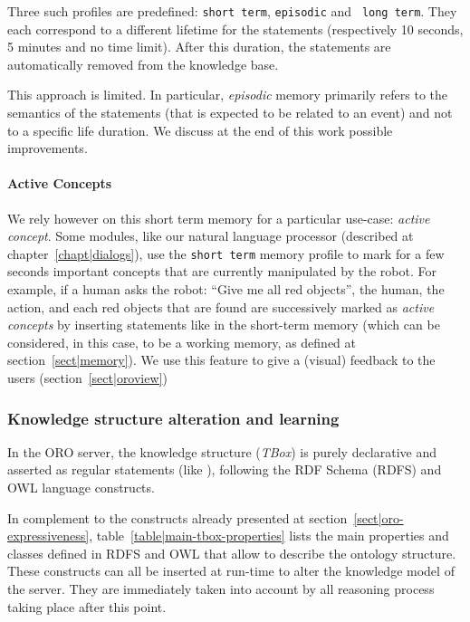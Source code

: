 Three such profiles are predefined: {\tt short term}, {\tt episodic} and {\tt
long term}. They each correspond to a different lifetime for the statements
(respectively 10 seconds, 5 minutes and no time limit). After this duration,
the statements are automatically removed from the knowledge base.

This approach is limited. In particular, \emph{episodic} memory primarily refers
to the semantics of the statements (that is expected to be related to an event)
and not to a specific life duration. We discuss at the end of this work possible
improvements.

\paragraph{Active Concepts} We rely however on this short term memory for a
particular use-case:  \emph{active concept}. Some modules, like our natural
language processor (described at chapter~\ref{chapt|dialogs}), use
the {\tt short term} memory profile to mark for a few seconds important
concepts that are currently manipulated by the robot. For example, if a human
asks the robot: ``Give me all red objects'', the human, the 
action, and each red objects that are found are successively marked as
\emph{active concepts} by inserting statements like  in the short-term memory (which can be considered, in this case,
to be a working memory, as defined at section~\ref{sect|memory}). We use this
feature to give a (visual) feedback to the users (section~\ref{sect|oroview})

\subsubsection{Knowledge structure alteration and learning}

In the ORO server, the knowledge structure (\emph{TBox}) is purely declarative
and asserted as regular statements (like ), following the RDF Schema (RDFS) and OWL language constructs.

In complement to the constructs already presented at
section~\ref{sect|oro-expressiveness}, table~\ref{table|main-tbox-properties}
lists the main properties and classes defined in RDFS and OWL that allow to
describe the ontology structure. These constructs can all be inserted at
run-time to alter the knowledge model of the server. They are immediately taken
into account by all reasoning process taking place after this point.

